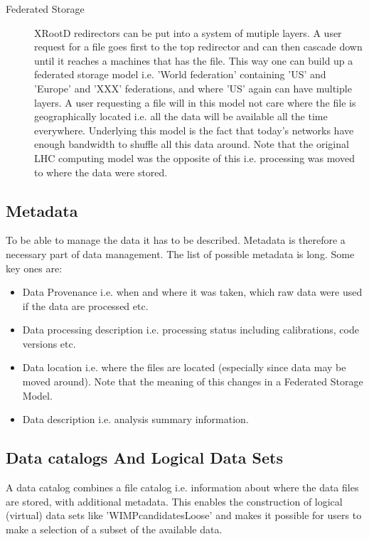 \begin{description}
\item[Federated Storage] XRootD redirectors can be put into a system of mutiple layers. A user request for a file goes first to the top 
redirector and can then cascade down until it reaches a machines that has the file. This way one can build up a federated storage model i.e. 
'World federation' containing 'US' and 'Europe' and 'XXX' federations, and where 'US' again can have multiple layers. A user requesting a file 
will in this model not care where the file is geographically located i.e. all the data will be available all the time everywhere. Underlying this 
model is the fact that today's networks have enough bandwidth to shuffle all this data around. 
Note that the original LHC computing model was the opposite of this i.e. processing was moved to where the data were stored.
\end{description}


\subsection{Metadata}
To be able to manage the data it has to be described. Metadata is therefore a necessary part of data management. The 
list of possible metadata is long. Some key ones are:

\begin{itemize}
\item Data Provenance i.e. when and where it was taken, which raw data were used if the data are processed etc.
\item Data processing description i.e. processing status including calibrations, code versions etc.
\item Data location i.e. where the files are located (especially since data may be moved around). Note that the meaning of this changes in a 
Federated Storage Model. 
\item Data description i.e. analysis summary information.
\end{itemize}



\subsection{Data catalogs And Logical Data Sets}
A data catalog combines a file catalog i.e. information about where the data files are stored, with additional metadata.
This enables the construction of logical (virtual) data sets like 'WIMPcandidatesLoose' and makes it possible for users to 
make a selection of a subset of the available data.

